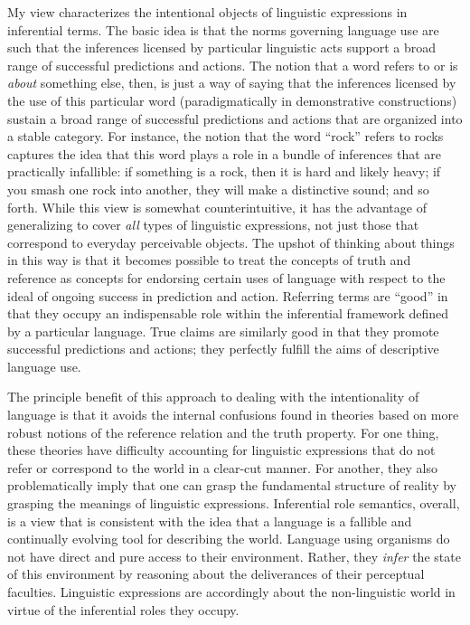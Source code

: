 My view characterizes the intentional objects of linguistic expressions in inferential terms. The basic idea is that the norms governing language use are such that the inferences licensed by particular linguistic acts support a broad range of successful predictions and actions. The notion that a word refers to or is \textit{about} something else, then, is just a way of saying that the inferences licensed by the use of this particular word (paradigmatically in demonstrative constructions) sustain a broad range of successful predictions and actions that are organized into a stable category. For instance, the notion that the word ``rock'' refers to rocks captures the idea that this word plays a role in a bundle of inferences that are practically infallible: if something is a rock, then it is hard and likely heavy; if you smash one rock into another, they will make a distinctive sound; and so forth. While this view is somewhat counterintuitive, it has the advantage of generalizing to cover \textit{all} types of linguistic expressions, not just those that correspond to everyday perceivable objects. The upshot of thinking about things in this way is that it becomes possible to treat the concepts of truth and reference as concepts for endorsing certain uses of language with respect to the ideal of ongoing success in prediction and action. Referring terms are ``good'' in that they occupy an indispensable role within the inferential framework defined by a particular language. True claims are similarly good in that they promote successful predictions and actions; they perfectly fulfill the aims of descriptive language use. 

The principle benefit of this approach to dealing with the intentionality of language is that it avoids the internal confusions found in theories based on more robust notions of the reference relation and the truth property. For one thing, these theories have difficulty accounting for linguistic expressions that do not refer or correspond to the world in a clear-cut manner. For another, they also problematically imply that one can grasp the fundamental structure of reality by grasping the meanings of linguistic expressions. Inferential role semantics, overall, is a view that is consistent with the idea that a language is a fallible and continually evolving tool for describing the world. Language using organisms do not have direct and pure access to their environment. Rather, they \textit{infer} the state of this environment by reasoning about the deliverances of their perceptual faculties. Linguistic expressions are accordingly about the non-linguistic world in virtue of the inferential roles they occupy. 

